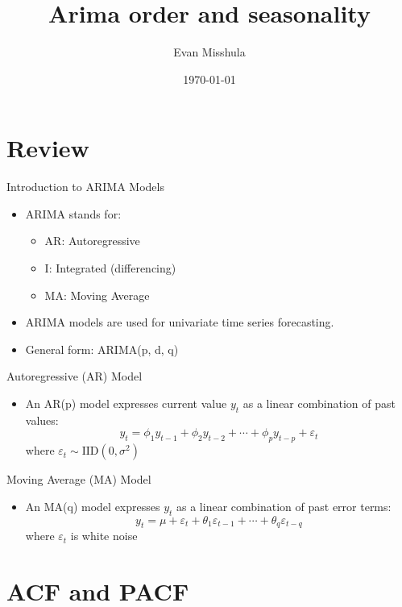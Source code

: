 \documentclass[aspectratio=169]{beamer}
\author{Evan Misshula}
\date{\today}
\title{Arima order and seasonality}
\begin{document}
\maketitle

\section{Review}
\label{sec:org7db1a04}
\begin{frame}[label={sec:org950063c}]{Introduction to ARIMA Models}
\begin{itemize}
\item ARIMA stands for:
\begin{itemize}
\item AR: Autoregressive
\item I: Integrated (differencing)
\item MA: Moving Average
\end{itemize}
\item ARIMA models are used for univariate time series forecasting.
\item General form: ARIMA(p, d, q)
\end{itemize}
\end{frame}



\begin{frame}[label={sec:org7246426}]{Autoregressive (AR) Model}
\begin{itemize}
\item An AR(p) model expresses current value \(y_t\) as a linear combination of past values:
\[
    y_t = \phi_1 y_{t-1} + \phi_2 y_{t-2} + \cdots + \phi_p y_{t-p} + \varepsilon_t
  \]
where \(\varepsilon_t \sim \text{IID}(0, \sigma^2)\)
\end{itemize}
\end{frame}

\begin{frame}[label={sec:org62a8983}]{Moving Average (MA) Model}
\begin{itemize}
\item An MA(q) model expresses \(y_t\) as a linear combination of past error terms:
\[
    y_t = \mu + \varepsilon_t + \theta_1 \varepsilon_{t-1} + \cdots + \theta_q \varepsilon_{t-q}
  \]
where \(\varepsilon_t\) is white noise
\end{itemize}
\end{frame}

\section{ACF and PACF}
\label{sec:orgd3ea40f}
\end{document}
